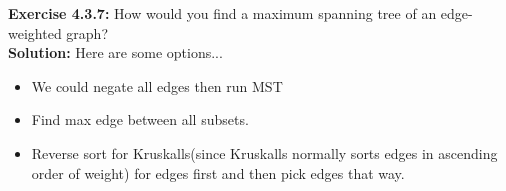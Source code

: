 \documentclass[11pt,fleqn]{article}
\begin{document}
\textbf{Exercise 4.3.7:} How would you find a maximum spanning tree of an edge-weighted graph?\\

\textbf{Solution:} Here are some options...
\begin{itemize}
	\item We could negate all edges then run MST
	\item Find max edge between all subsets.
	\item Reverse sort for Kruskalls(since Kruskalls normally sorts edges in ascending order of weight) for edges first and then pick edges that way.


\end{itemize}



	
\end{document}
